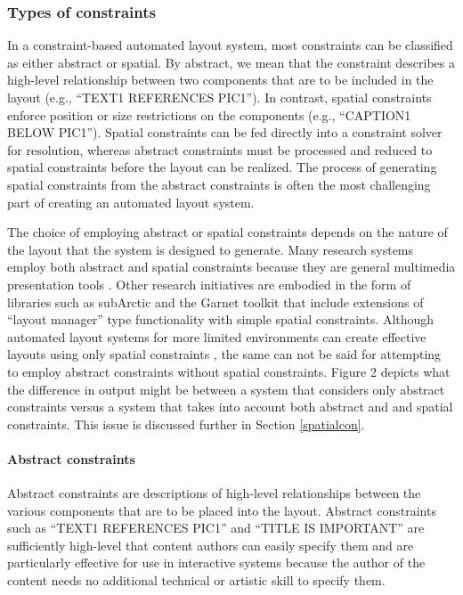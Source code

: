    \subsubsection{Types of constraints}

     In a constraint-based automated layout system, most constraints can be
     classified as either abstract or spatial. By abstract, we mean that the
     constraint describes a high-level relationship between two components that
     are to be included in the layout (e.g., “TEXT1 REFERENCES PIC1”). In
     contrast, spatial constraints enforce position or size restrictions on the
     components (e.g., “CAPTION1 BELOW PIC1”). Spatial constraints can be fed
     directly into a constraint solver for resolution, whereas abstract
     constraints must be processed and reduced to spatial constraints before the
     layout can be realized. The process of generating spatial constraints from
     the abstract constraints is often the most challenging part of creating an
     automated layout system.

     The choice of employing abstract or spatial constraints depends on the
     nature of the layout that the system is designed to generate. Many research
     systems employ both abstract and spatial constraints because they are
     general multimedia presentation tools \citep{feiner-1,weitzman-2,graf-1}.
     Other research initiatives are embodied in the form of libraries such as
     subArctic \citep{hudson-3,hudson-1} and the Garnet toolkit \citep{myers-2}
     that include extensions of “layout manager” type functionality with simple
     spatial constraints. Although automated layout systems for more limited
     environments can create effective layouts using only spatial constraints
     \citep{kosak-1}, the same can not be said for attempting to employ abstract
     constraints without spatial constraints. Figure 2 depicts what the
     difference in output might be between a system that considers only abstract
     constraints versus a system that takes into account both abstract and and
     spatial constraints. This issue is discussed further in Section
     \ref{spatialcon}.

     \paragraph{Abstract constraints}

      Abstract constraints are descriptions of high-level relationships between
      the various components that are to be placed into the layout. Abstract
      constraints such as “TEXT1 REFERENCES PIC1” and “TITLE IS IMPORTANT” are
      sufficiently high-level that content authors can easily specify them and
      are particularly effective for use in interactive systems because the
      author of the content needs no additional technical or artistic skill to
      specify them.

